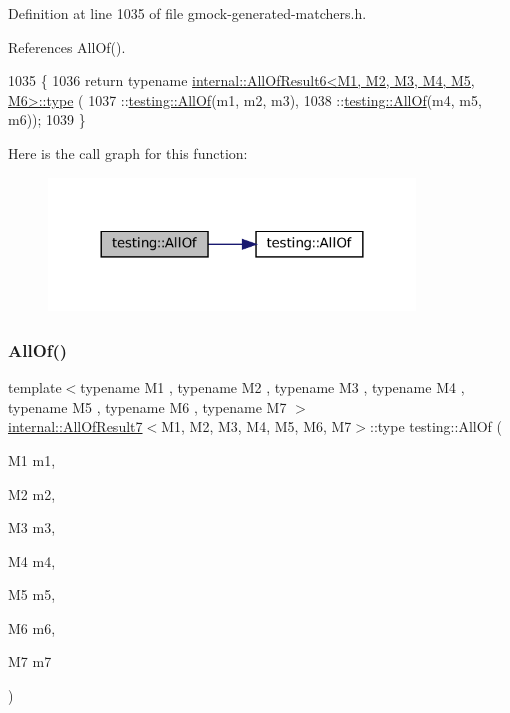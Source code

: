 Definition at line 1035 of file gmock-\/generated-\/matchers.\+h.



References All\+Of().


\begin{DoxyCode}
1035                                                 \{
1036   \textcolor{keywordflow}{return} \textcolor{keyword}{typename} \hyperlink{namespacegenerate__debs_a50bc9a7ecac9584553e089a448bcde58}{internal::AllOfResult6<M1, M2, M3, M4, M5, M6>::type}
      (
1037       ::\hyperlink{namespacetesting_af7618e8606c1cb45738163688944e2b7}{testing::AllOf}(m1, m2, m3),
1038       ::\hyperlink{namespacetesting_af7618e8606c1cb45738163688944e2b7}{testing::AllOf}(m4, m5, m6));
1039 \}
\end{DoxyCode}
Here is the call graph for this function\+:
\nopagebreak
\begin{figure}[H]
\begin{center}
\leavevmode
\includegraphics[width=276pt]{namespacetesting_afc8e2d405f80e7d3df32842ddb648125_cgraph}
\end{center}
\end{figure}
\mbox{\label{namespacetesting_acbd4eef50126ff6db5b93ac5faa71b45}} 
\subsubsection{\texorpdfstring{All\+Of()}{AllOf()}\hspace{0.1cm}{\footnotesize\ttfamily [6/9]}}
{\footnotesize\ttfamily template$<$typename M1 , typename M2 , typename M3 , typename M4 , typename M5 , typename M6 , typename M7 $>$ \\
\hyperlink{structtesting_1_1internal_1_1AllOfResult7}{internal\+::\+All\+Of\+Result7}$<$M1, M2, M3, M4, M5, M6, M7$>$\+::type testing\+::\+All\+Of (\begin{DoxyParamCaption}\item[{M1}]{m1,  }\item[{M2}]{m2,  }\item[{M3}]{m3,  }\item[{M4}]{m4,  }\item[{M5}]{m5,  }\item[{M6}]{m6,  }\item[{M7}]{m7 }\end{DoxyParamCaption})\hspace{0.3cm}{\ttfamily [inline]}}



